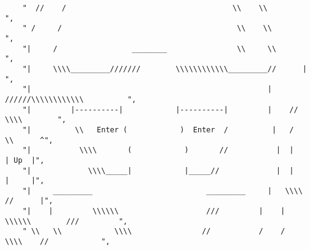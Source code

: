 \begin{lstlisting}
	"  //    /                                      \\    \\                               ",
	" /     /                                        \\    \\                              ",
	"|     /                 ________                \\     \\                             ",
	"|     \\\\_________///////        \\\\\\\\\\\\_________//      |                            ",
	"|                                                      |      //////\\\\\\\\\\\\          ",
	"|         |----------|            |----------|         |    //            \\\\        ",
	"|          \\   Enter (            )  Enter  /          |   /                \\      ^",
	"|           \\\\       (            )       //           |  |                  | Up  |",
	"|             \\\\_____|            |_____//             |  |                  |     |",
	"|     _________                          _________     |   \\\\              //      |",
	"|    |         \\\\\\                    ///         |    |     \\\\\\        ///         ",
	" \\   \\            \\\\                //           /    /         \\\\    //            ",

\end{lstlisting}
